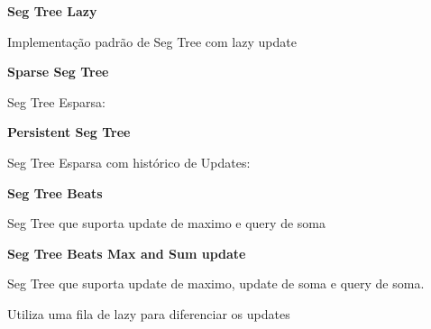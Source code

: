 \documentclass[11pt, a4paper, twoside]{book}
\begin{document}
\textbf{Seg Tree Lazy} 

Implementação padrão de Seg Tree com lazy update





\textbf{Sparse Seg Tree} 

Seg Tree Esparsa:





\textbf{Persistent Seg Tree} 

Seg Tree Esparsa com histórico de Updates:





\textbf{Seg Tree Beats} 

Seg Tree que suporta update de maximo e query de soma





\textbf{Seg Tree Beats Max and Sum update} 

Seg Tree que suporta update de maximo, update de soma e query de soma.

Utiliza uma fila de lazy para diferenciar os updates




\hfill
\end{document}
